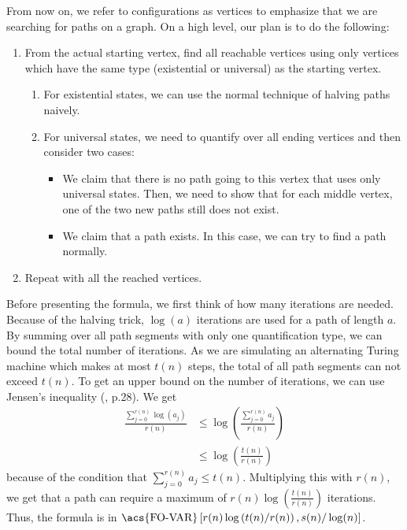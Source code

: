 From now on, we refer to configurations as vertices to emphasize that we are searching for paths on a graph.
On a high level, our plan is to do the following:
\begin{enumerate}
    \setlength\itemsep{0.15em}
    \item From the actual starting vertex, find all reachable vertices using only vertices which have the same type (existential or universal) as the starting vertex.
    \begin{enumerate}
        \item For existential states, we can use the normal technique of halving paths naively.
        \item For universal states, we need to quantify over all ending vertices and then consider two cases:
        \begin{itemize}
            \item We claim that there is no path going to this vertex that uses only universal states.
            Then, we need to show that for each middle vertex, one of the two new paths still does not exist.
            \item We claim that a path exists.
            In this case, we can try to find a path normally.
        \end{itemize}
    \end{enumerate}
    \item Repeat with all the reached vertices.
\end{enumerate}

Before presenting the formula, we first think of how many iterations are needed.
Because of the halving trick,  $\log(a)$ iterations are used for a path of length $a$.
By summing over all path segments with only one quantification type, we can bound the total number of iterations.
As we are simulating an alternating Turing machine which makes at most $t(n)$ steps, the total of all path segments can not exceed $t(n)$.
To get an upper bound on the number of iterations, we can use Jensen's inequality (\cite{inequalities-math-oly}, p.28).
We get
\[
    \begin{aligned}
        \frac{\sum_{j = 0}^{r(n)}\log(a_{j})}{r(n)} &\leq \log\left(\frac{\sum_{j= 0}^{r(n)}a_{j}}{r(n)} \right)  \\
        &\leq \log\left(\frac{t(n)}{r(n)} \right)
    \end{aligned}
\]
because of the condition that $\sum_{j= 0}^{r(n)}a_{j} \leq t(n)$.
Multiplying this with $r(n)$, we get that a path can require a maximum of $r(n)\log\left(\frac{t(n)}{r(n)} \right)$ iterations.
Thus, the formula is in ${\text{\acs{FO-VAR}}\left[r(n)\log\left(t(n)/r(n) \right), s(n)/\log(n) \right]}$.


